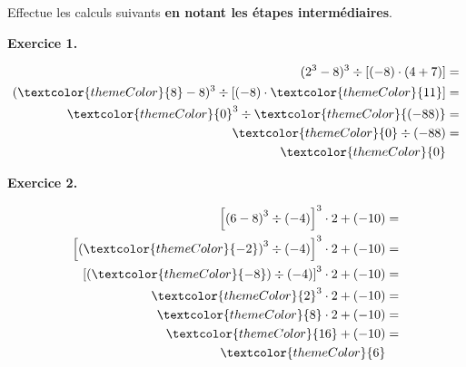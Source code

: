 

Effectue les calculs suivants \textbf{en notant les étapes intermédiaires}.

\vspace{30pt}
{\bfseries\color{themeColor}Exercice 1.} 

{\vspace{-30pt}\color{black}
\begin{align*}
(2^3 - 8)^3 \div \left[(-8) \cdot (4 +7)\right]  &= \\
(\textcolor{themeColor}{8} - 8)^3 \div \left[(-8) \cdot \textcolor{themeColor}{11}\right]  &= \\
\textcolor{themeColor}{0}^3 \div \textcolor{themeColor}{(-88)}&= \\
\textcolor{themeColor}{0} \div (-88)&= \\
\textcolor{themeColor}{0}
\end{align*}
}

\vspace{30pt}
{\bfseries\color{themeColor}Exercice 2.} 

{\vspace{-30pt}\color{black}
\begin{align*}
\left[\left(6-8\right)^3 \div \left(-4\right)\right]^3 \cdot 2 + \left(-10\right) &=\\
\left[\left(\textcolor{themeColor}{-2}\right)^3 \div \left(-4\right)\right]^3 \cdot 2 + \left(-10\right) &=\\
\left[\left(\textcolor{themeColor}{-8}\right) \div \left(-4\right)\right]^3 \cdot 2 + \left(-10\right) &=\\
\textcolor{themeColor}{2}^3 \cdot 2 + \left(-10\right) &=\\
\textcolor{themeColor}{8} \cdot 2 + \left(-10\right) &=\\
\textcolor{themeColor}{16} + \left(-10\right) &=\\
\textcolor{themeColor}{6}
\end{align*}
}

